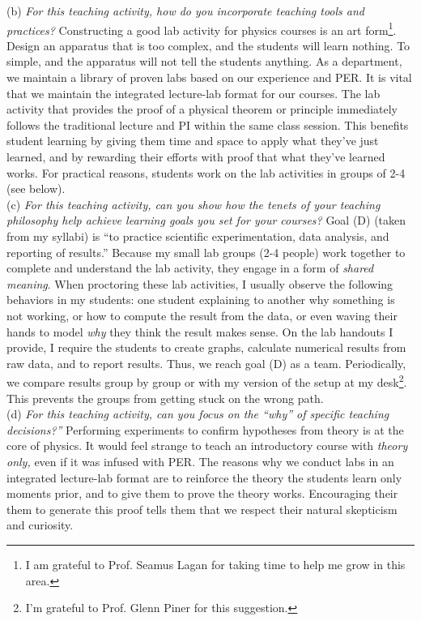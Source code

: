 \documentclass[../../../main.tex]{subfiles}
\begin{document}
(b) \textit{For this teaching activity, how do you incorporate teaching tools and practices?}  Constructing a good lab activity for physics courses is an art form\footnote{I am grateful to Prof. Seamus Lagan for taking time to help me grow in this area.}.  Design an apparatus that is too complex, and the students will learn nothing.  To simple, and the apparatus will not tell the students anything.  As a department, we maintain a library of proven labs based on our experience and PER.  It is vital that we maintain the integrated lecture-lab format for our courses.  The lab activity that provides the proof of a physical theorem or principle immediately follows the traditional lecture and PI within the same class session.  This benefits student learning by giving them time and space to apply what they've just learned, and by rewarding their efforts with proof that what they've learned works.  For practical reasons, students work on the lab activities in groups of 2-4 (see below).
\\
\vspace{0.25cm}
(c) \textit{For this teaching activity, can you show how the tenets of your teaching philosophy help achieve learning goals you
set for your courses?}  Goal (D) (taken from my syllabi) is ``to practice scientific experimentation, data analysis, and reporting of results.''  Because my small lab groups (2-4 people) work together to complete and understand the lab activity, they engage in a form of \textit{shared meaning}.  When proctoring these lab activities, I usually observe the following behaviors in my students: one student explaining to another why something is not working, or how to compute the result from the data, or even waving their hands to model \textit{why} they think the result makes sense.  On the lab handouts I provide, I require the students to create graphs, calculate numerical results from raw data, and to report results.  Thus, we reach goal (D) as a team.  Periodically, we compare results group by group or with my version of the setup at my desk\footnote{I'm grateful to Prof. Glenn Piner for this suggestion.}.  This prevents the groups from getting stuck on the wrong path.
\\
\vspace{0.25cm}
(d) \textit{For this teaching activity, can you focus on the ``why'' of specific teaching decisions?''}  Performing experiments to confirm hypotheses from theory is at the core of physics.  It would feel strange to teach an introductory course with \textit{theory only,} even if it was infused with PER.  The reasons why we conduct labs in an integrated lecture-lab format are to reinforce the theory the students learn only moments prior, and to give them to prove the theory works.  Encouraging their them to generate this proof tells them that we respect their natural skepticism and curiosity.
\end{document}
